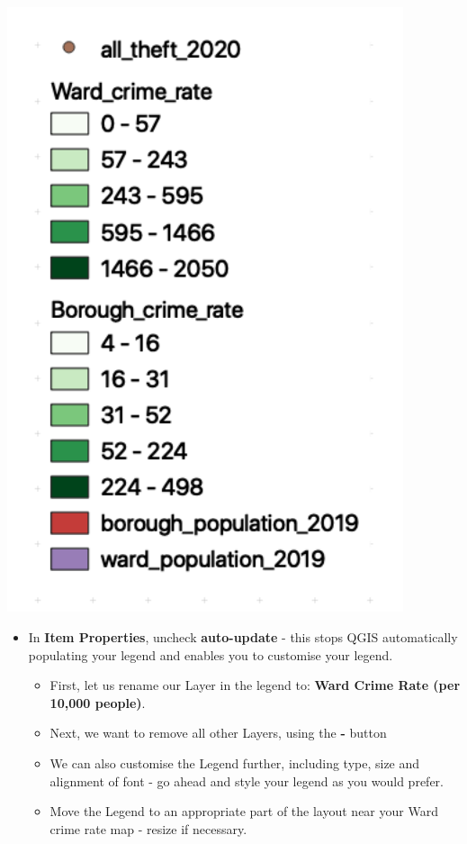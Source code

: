 \documentclass[
]{book}
\providecommand{\tightlist}{%
  \setlength{\itemsep}{0pt}\setlength{\parskip}{0pt}}
\begin{document}
\begin{center}\includegraphics[width=4.58in]{images/w03/autolegend} \end{center}

\begin{itemize}
\tightlist
\item
  In \textbf{Item Properties}, uncheck \textbf{auto-update} - this stops QGIS automatically populating your legend and enables you to customise your legend.

  \begin{itemize}
  \tightlist
  \item
    First, let us rename our Layer in the legend to: \textbf{Ward Crime Rate (per 10,000 people)}.
  \item
    Next, we want to remove all other Layers, using the \textbf{-} button
  \item
    We can also customise the Legend further, including type, size and alignment of font - go ahead and style your legend as you would prefer.
  \item
    Move the Legend to an appropriate part of the layout near your Ward crime rate map - resize if necessary.
  \end{itemize}
\end{itemize}
\end{document}
